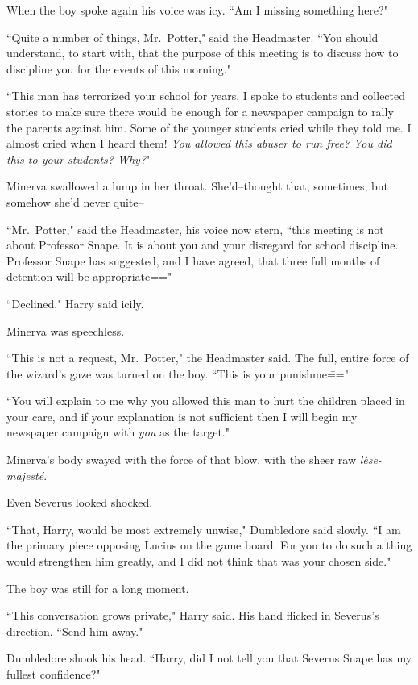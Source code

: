 When the boy spoke again his voice was icy. ``Am I missing something here?"

``Quite a number of things, Mr.~Potter," said the Headmaster. ``You should understand, to start with, that the purpose of this meeting is to discuss how to discipline you for the events of this morning."

``This man has terrorized your school for years. I spoke to students and collected stories to make sure there would be enough for a newspaper campaign to rally the parents against him. Some of the younger students cried while they told me. I almost cried when I heard them! \emph{You allowed this abuser to run free? You did this to your students? Why?}"

Minerva swallowed a lump in her throat. She'd\---thought that, sometimes, but somehow she'd never quite\---

``Mr.~Potter," said the Headmaster, his voice now stern, ``this meeting is not about Professor Snape. It is about you and your disregard for school discipline. Professor Snape has suggested, and I have agreed, that three full months of detention will be appropriate\==="

``Declined," Harry said icily.

Minerva was speechless.

``This is not a request, Mr.~Potter," the Headmaster said. The full, entire force of the wizard's gaze was turned on the boy. ``This is your punishme\==="

``You will explain to me why you allowed this man to hurt the children placed in your care, and if your explanation is not sufficient then I will begin my newspaper campaign with \emph{you} as the target."

Minerva's body swayed with the force of that blow, with the sheer raw \emph{lèse-majesté}.

Even Severus looked shocked.

``That, Harry, would be most extremely unwise," Dumbledore said slowly. ``I am the primary piece opposing Lucius on the game board. For you to do such a thing would strengthen him greatly, and I did not think that was your chosen side."

The boy was still for a long moment.

``This conversation grows private," Harry said. His hand flicked in Severus's direction. ``Send him away."

Dumbledore shook his head. ``Harry, did I not tell you that Severus Snape has my fullest confidence?"

